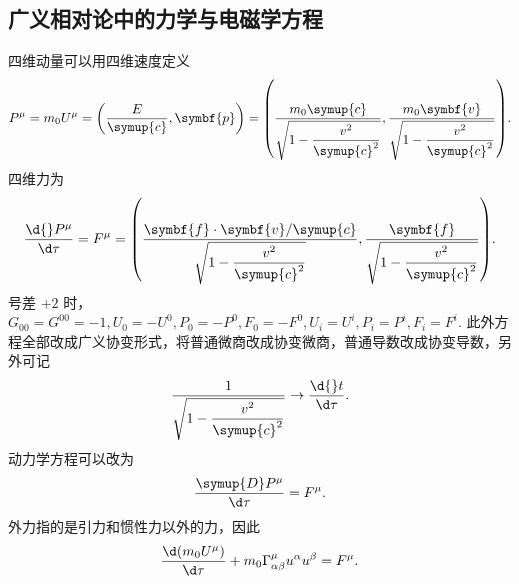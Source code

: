 \documentclass[UTF8, 12pt, a4paper, oneside, onecolumn, fontset=none]{ctexart}
\begin{document}
\subsection{广义相对论中的力学与电磁学方程}
四维动量可以用四维速度定义
\begin{equation}
P^{\mu}=m_{0}U^{\mu}=\mleft(\frac{E}{\symup{c}},\symbf{p}\mright)=\mleft(\frac{m_{0}\symup{c}}{\sqrt{1-\dfrac{v^{2}}{\symup{c}^{2}}}},\frac{m_{0}\symbf{v}}{\sqrt{1-\dfrac{v^{2}}{\symup{c}^{2}}}}\mright).
\end{equation}
四维力为
\begin{equation}
\frac{\d{}P^{\mu}}{\d\tau}=F^{\mu}=\mleft(\frac{\symbf{f}\cdot\symbf{v}/\symup{c}}{\sqrt{1-\dfrac{v^{2}}{\symup{c}^{2}}}},\frac{\symbf{f}}{\sqrt{1-\dfrac{v^{2}}{\symup{c}^{2}}}}\mright).
\end{equation}
号差 $+2$ 时，$G_{00}=G^{00}=-1, U_{0}=-U^{0}, P_{0}=-P^{0}, F_{0}=-F^{0}, U_{i}=U^{i}, P_{i}=P^{i}, F_{i}=F^{i}$. 此外方程全部改成广义协变形式，将普通微商改成协变微商，普通导数改成协变导数，另外可记
\begin{equation}
\frac{1}{\sqrt{1-\dfrac{v^{2}}{\symup{c}^{2}}}}\to\frac{\d{}t}{\d\tau}.
\end{equation}
动力学方程可以改为
\begin{equation}
\frac{\symup{D}P^{\mu}}{\d\tau}=F^{\mu}.
\end{equation}
外力指的是引力和惯性力以外的力，因此
\begin{equation}
\frac{\d\mleft(m_{0}U^{\mu}\mright)}{\d\tau}+m_{0}\Gamma_{\alpha\beta}^{\mu}u^{\alpha}u^{\beta}=F^{\mu}.
\end{equation}
\end{document}
